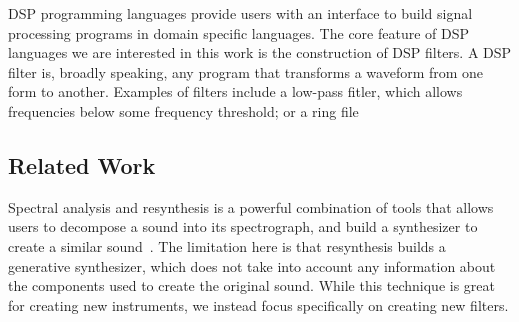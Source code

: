 DSP programming languages provide users with an interface to build signal processing programs in domain specific languages.
The core feature of DSP languages we are interested in this work is the construction of DSP filters.
A DSP filter is, broadly speaking, any program that transforms a waveform from one form to another.
Examples of filters include a low-pass fitler, which allows frequencies below some frequency threshold; or a ring file


\subsection{Related Work}

Spectral analysis and resynthesis is a powerful combination of tools that allows users to decompose a sound into its spectrograph, and build a synthesizer to create a similar sound~\cite{?}.
The limitation here is that resynthesis builds a generative synthesizer, which does not take into account any information about the components used to create the original sound.
While this technique is great for creating new instruments, we instead focus specifically on creating new filters.
